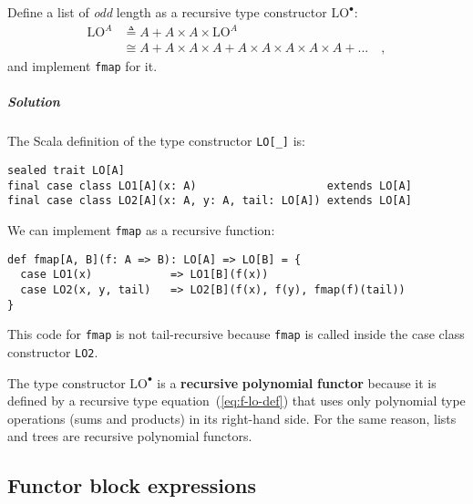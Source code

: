 Define a list of \emph{odd} length as a recursive type constructor
$\text{LO}^{\bullet}$:
\begin{align}
\text{LO}^{A} & \triangleq A+A\times A\times\text{LO}^{A}\label{eq:f-lo-def}\\
 & \cong A+A\times A\times A+A\times A\times A\times A\times A+...\quad,\nonumber 
\end{align}
and implement \lstinline!fmap! for it.

\subparagraph{Solution}

The Scala definition of the type constructor \lstinline!LO[_]! is:

\begin{lstlisting}
sealed trait LO[A]
final case class LO1[A](x: A)                    extends LO[A]
final case class LO2[A](x: A, y: A, tail: LO[A]) extends LO[A]
\end{lstlisting}

We can implement \lstinline!fmap! as a recursive function:
\begin{lstlisting}
def fmap[A, B](f: A => B): LO[A] => LO[B] = {
  case LO1(x)            => LO1[B](f(x))
  case LO2(x, y, tail)   => LO2[B](f(x), f(y), fmap(f)(tail))
}
\end{lstlisting}
This code for \lstinline!fmap! is not tail-recursive because \lstinline!fmap!
is called inside the case class constructor \lstinline!LO2!. 

The type constructor $\text{LO}^{\bullet}$ is a \textbf{recursive}
\textbf{polynomial} \textbf{functor}
because it is defined by a recursive type equation~(\ref{eq:f-lo-def})
that uses only polynomial type operations (sums and products) in its
right-hand side. For the same reason, lists and trees are recursive
polynomial functors.

\subsection{Functor block expressions}

